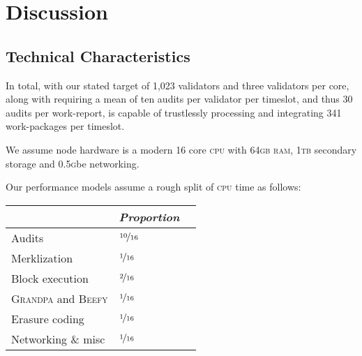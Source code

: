 \section{Discussion}\label{sec:discussion}




\subsection{Technical Characteristics}

In total, with our stated target of 1,023 validators and three validators per core, along with requiring a mean of ten audits per validator per timeslot, and thus 30 audits per work-report, \Jam is capable of trustlessly processing and integrating 341 work-packages per timeslot.

We assume node hardware is a modern 16 core \textsc{cpu} with 64\textsc{gb} \textsc{ram}, 1\textsc{tb} secondary storage and 0.5\textsc{g}be networking.

Our performance models assume a rough split of \textsc{cpu} time as follows:

\begin{center}
  \begin{tabular}[h]{@{}lll@{}}
    \toprule
    & \emph{Proportion} \\
    \midrule
    Audits & $\nicefrac{10}{16}$ \\
    Merklization & $\nicefrac{1}{16}$ \\
    Block execution & $\nicefrac{2}{16}$ \\
    \textsc{Grandpa} and \textsc{Beefy} & $\nicefrac{1}{16}$ \\
    Erasure coding & $\nicefrac{1}{16}$ \\
    Networking \& misc & $\nicefrac{1}{16}$ \\
    \bottomrule
  \end{tabular}
\end{center}

